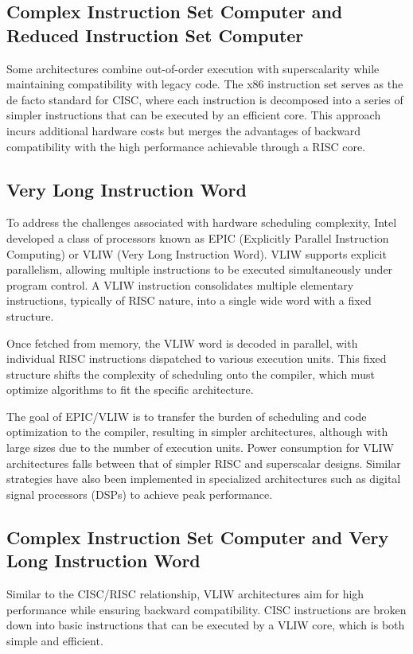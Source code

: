 \subsection{Complex Instruction Set Computer and Reduced Instruction Set Computer}
Some architectures combine out-of-order execution with superscalarity while maintaining compatibility with legacy code. 
The x86 instruction set serves as the de facto standard for CISC, where each instruction is decomposed into a series of simpler instructions that can be executed by an efficient core. 
This approach incurs additional hardware costs but merges the advantages of backward compatibility with the high performance achievable through a RISC core.

\subsection{Very Long Instruction Word}
To address the challenges associated with hardware scheduling complexity, Intel developed a class of processors known as EPIC (Explicitly Parallel Instruction Computing) or VLIW (Very Long Instruction Word). 
VLIW supports explicit parallelism, allowing multiple instructions to be executed simultaneously under program control. 
A VLIW instruction consolidates multiple elementary instructions, typically of RISC nature, into a single wide word with a fixed structure.

Once fetched from memory, the VLIW word is decoded in parallel, with individual RISC instructions dispatched to various execution units. 
This fixed structure shifts the complexity of scheduling onto the compiler, which must optimize algorithms to fit the specific architecture.

The goal of EPIC/VLIW is to transfer the burden of scheduling and code optimization to the compiler, resulting in simpler architectures, although with large sizes due to the number of execution units. 
Power consumption for VLIW architectures falls between that of simpler RISC and superscalar designs. 
Similar strategies have also been implemented in specialized architectures such as digital signal processors (DSPs) to achieve peak performance.

\subsection{Complex Instruction Set Computer and Very Long Instruction Word}
Similar to the CISC/RISC relationship, VLIW architectures aim for high performance while ensuring backward compatibility. 
CISC instructions are broken down into basic instructions that can be executed by a VLIW core, which is both simple and efficient.

